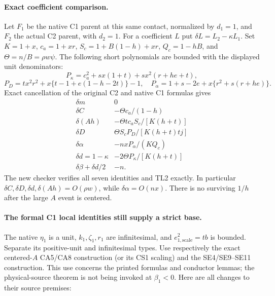 \paragraph{Exact coefficient comparison.}
Let $F_1$ be the native C1 parent at this same contact, normalized by
$d_1=1$, and $F_2$ the actual C2 parent, with $d_2=1$.
For a coefficient $L$ put $\delta L=L_2-\kappa L_1$.
Set $K=1+x$, $c_a=1+xr$, $S_c=1+B(1-h)+xr$, $Q_c=1-hB$,
and $\Theta=n/B=\rho w\psi$. The following short polynomials are
bounded with the displayed unit denominators:
\[
 P_\kappa=c_a^2+sx(1+t)+sx^2(r+he+t),
\]
\[
 P_D=tx^2r^2+x\{t-1+e(1-h-2t)\}-1,\quad
 P_\alpha=1+s-2e+x\{r^2+s(r+he)\}.
\]
Exact cancellation of the original C2 and native C1 formulas gives
\[
\begin{array}{c|l}
 \delta m&0\\
 \delta C&-\Theta c_a/(1-h)\\
 \delta(Ah)&-\Theta t c_aS_c/[K(h+t)]\\
 \delta D&\Theta S_cP_D/[K(h+t)tj]\\
 \delta\alpha&-nxP_\alpha/(KQ_c)\\
 \delta d=1-\kappa&-2\Theta P_\kappa/[K(h+t)]\\
 \delta\beta+\delta d/2&-n.
\end{array}
\tag{TL3}
\]
The new checker verifies all seven identities and TL2 exactly.
In particular $\delta C,\delta D,\delta d,\delta(Ah)=O(\rho w)$,
while $\delta\alpha=O(nx)$. There is no surviving $1/h$ after the
large $A$ event is centered.

\paragraph{The formal C1 local identities still supply a strict base.}
The native $\eta_1$ is a unit, $k_1,\zeta_1,r_1$ are infinitesimal,
and $e_{1,\mathrm{scale}}^2=tb$ is bounded. Separate its positive-unit
and infinitesimal types. Use respectively the exact centered-$A$
CA5/CA8 construction (or its CS1 scaling) and the SE4/SE9--SE11
construction. This use concerns the printed formulas and conductor
lemmas; the physical-source theorem is not being invoked at $\beta_1<0$.
Here are all changes to their source premises:

